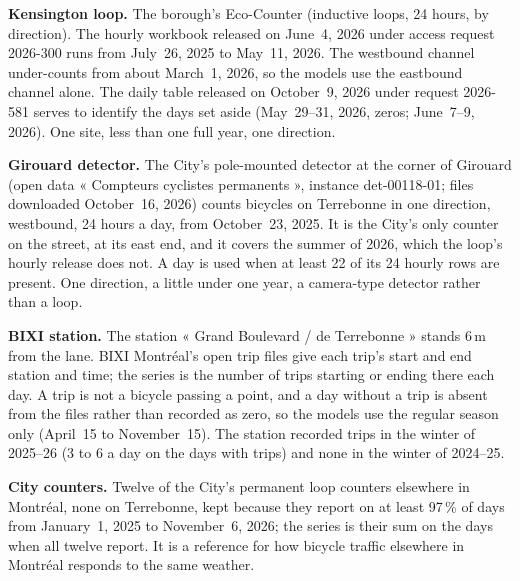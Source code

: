 \documentclass[11pt,a4paper]{article}
\begin{document}
\textbf{Kensington loop.} The borough\textquoteright{}s Eco-Counter (inductive loops, 24 hours, by direction). The hourly workbook released on June~4, 2026 under access request 2026-300 runs from July~26, 2025 to May~11, 2026. The westbound channel under-counts from about March~1, 2026, so the models use the eastbound channel alone. The daily table released on October~9, 2026 under request 2026-581 serves to identify the days set aside (May~29--31, 2026, zeros; June~7--9, 2026). One site, less than one full year, one direction.

\textbf{Girouard detector.} The City\textquoteright{}s pole-mounted detector at the corner of Girouard (open data « Compteurs cyclistes permanents », instance det-00118-01; files downloaded October~16, 2026) counts bicycles on Terrebonne in one direction, westbound, 24 hours a day, from October~23, 2025. It is the City\textquoteright{}s only counter on the street, at its east end, and it covers the summer of 2026, which the loop\textquoteright{}s hourly release does not. A day is used when at least 22 of its 24 hourly rows are present. One direction, a little under one year, a camera-type detector rather than a loop.

\textbf{BIXI station.} The station « Grand Boulevard / de Terrebonne » stands 6\,m from the lane. BIXI Montréal\textquoteright{}s open trip files give each trip\textquoteright{}s start and end station and time; the series is the number of trips starting or ending there each day. A trip is not a bicycle passing a point, and a day without a trip is absent from the files rather than recorded as zero, so the models use the regular season only (April~15 to November~15). The station recorded trips in the winter of 2025--26 (3 to 6 a day on the days with trips) and none in the winter of 2024--25.

\textbf{City counters.} Twelve of the City\textquoteright{}s permanent loop counters elsewhere in Montréal, none on Terrebonne, kept because they report on at least 97\,\% of days from January~1, 2025 to November~6, 2026; the series is their sum on the days when all twelve report. It is a reference for how bicycle traffic elsewhere in Montréal responds to the same weather.
\end{document}
